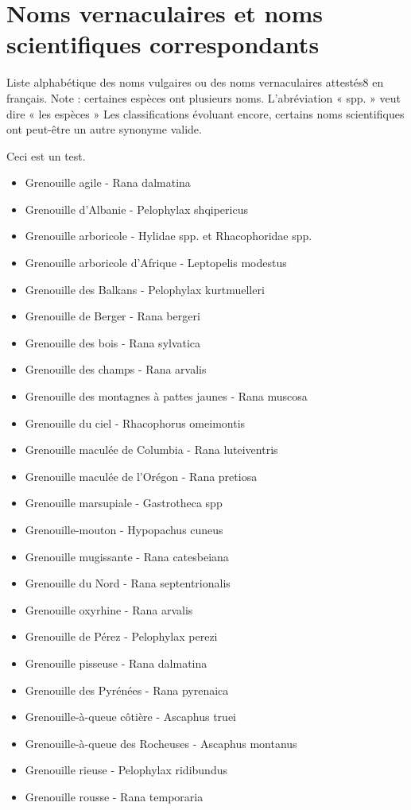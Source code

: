 
\section{Noms vernaculaires et noms scientifiques correspondants}
 
 Liste alphabétique des noms vulgaires ou des noms vernaculaires attestés8 en français.
Note : certaines espèces ont plusieurs noms. L'abréviation « spp. » veut dire « les espèces »
Les classifications évoluant encore, certains noms scientifiques ont peut-être un autre synonyme valide.


Ceci est un test. 

\begin{multicols}{2}
    \begin{itemize}
  
\item Grenouille agile - Rana dalmatina 
\item Grenouille d'Albanie - Pelophylax shqipericus 
\item Grenouille arboricole - Hylidae spp. et Rhacophoridae spp.
\item Grenouille arboricole d'Afrique - Leptopelis modestus 
\item Grenouille des Balkans - Pelophylax kurtmuelleri 
\item Grenouille de Berger - Rana bergeri 
\item Grenouille des bois - Rana sylvatica 
\item Grenouille des champs - Rana arvalis 
\item Grenouille des montagnes à pattes jaunes - Rana muscosa
\item Grenouille du ciel - Rhacophorus omeimontis 
\item Grenouille maculée de Columbia - Rana luteiventris 
\item Grenouille maculée de l'Orégon - Rana pretiosa 
\item Grenouille marsupiale - Gastrotheca spp 
\item Grenouille-mouton - Hypopachus cuneus 
\item Grenouille mugissante - Rana catesbeiana
\item Grenouille du Nord - Rana septentrionalis 
\item Grenouille oxyrhine - Rana arvalis
\item Grenouille de Pérez - Pelophylax perezi 
\item Grenouille pisseuse - Rana dalmatina
\item Grenouille des Pyrénées - Rana pyrenaica 
\item Grenouille-à-queue côtière - Ascaphus truei 
\item Grenouille-à-queue des Rocheuses - Ascaphus montanus 
\item Grenouille rieuse - Pelophylax ridibundus 
\item Grenouille rousse - Rana temporaria 
\end{itemize}
\end{multicols}    

